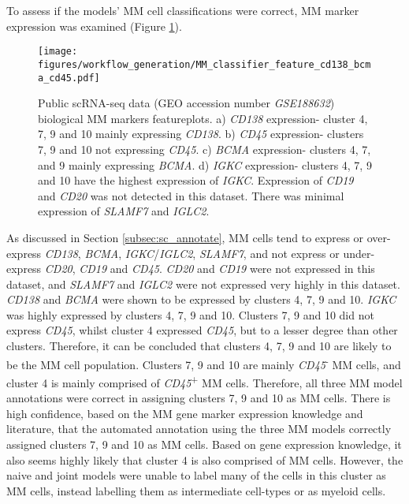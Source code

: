 To assess if the models' MM cell classifications were correct, MM marker expression was examined (Figure \ref{fig:mm_class_ftp_cd138_cd45_bcma}).
\begin{figure}[htb]
\centering
\texttt{[image: figures/workflow\_generation/MM\_classifier\_feature\_cd138\_bcma\_cd45.pdf]}
\caption[Public scRNA-seq data bioligical MM markers featureplots]{Public scRNA-seq data (GEO accession number \textit{GSE188632}) biological MM markers featureplots.
a) \textit{CD138} expression- cluster 4, 7, 9 and 10 mainly expressing \textit{CD138}.
b) \textit{CD45} expression- clusters 7, 9 and 10 not expressing \textit{CD45}.
c) \textit{BCMA} expression- clusters 4, 7, and 9 mainly expressing \textit{BCMA}.
d) \textit{IGKC} expression- clusters 4, 7, 9 and 10 have the highest expression of \textit{IGKC}.
Expression of \textit{CD19} and \textit{CD20} was not detected in this dataset.
There was minimal expression of \textit{SLAMF7} and \textit{IGLC2}.
}
\label{fig:mm_class_ftp_cd138_cd45_bcma}
\end{figure}
%
As discussed in Section \ref{subsec:sc_annotate}, MM cells tend to express or over-express \textit{CD138}, \textit{BCMA}, \textit{IGKC}/\textit{IGLC2}, \textit{SLAMF7}, and not express or under-express \textit{CD20}, \textit{CD19} and \textit{CD45}.
\textit{CD20} and \textit{CD19} were not expressed in this dataset, and \textit{SLAMF7} and \textit{IGLC2} were not expressed very highly in this dataset.
\textit{CD138} and \textit{BCMA} were shown to be expressed by clusters 4, 7, 9 and 10.
\textit{IGKC} was highly expressed by clusters 4, 7, 9 and 10.
Clusters 7, 9 and 10 did not express \textit{CD45}, whilst cluster 4 expressed \textit{CD45}, but to a lesser degree than other clusters.
Therefore, it can be concluded that clusters 4, 7, 9 and 10 are likely to be the MM cell population.
Clusters 7, 9 and 10 are mainly \textit{CD45}\textsuperscript{-} MM cells, and cluster 4 is mainly comprised of \textit{CD45}\textsuperscript{+} MM cells.
Therefore, all three MM model annotations were correct in assigning clusters 7, 9 and 10 as MM cells.
There is high confidence, based on the MM gene marker expression knowledge and literature, that the automated annotation using the three MM models correctly assigned clusters 7, 9 and 10 as MM cells.
Based on gene expression knowledge, it also seems highly likely that cluster 4 is also comprised of MM cells.
However, the naive and joint models were unable to label many of the cells in this cluster as MM cells, instead labelling them as intermediate cell-types or as myeloid cells.

